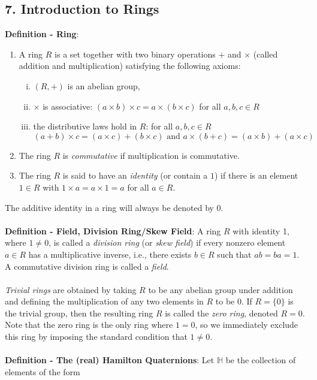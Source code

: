 \documentclass{article}
\begin{document}
\subsection*{7. Introduction to Rings}
\textbf{Definition - Ring}: \begin{enumerate}
    \item A ring $R$ is a set together with two binary operations $+$ and $\times$ (called addition and multiplication) satisfying the following axioms: \begin{enumerate}[(i).]
        \item $(R, +)$ is an abelian group,
        \item $\times$ is associative: $(a \times b) \times c = a \times (b \times c)$ for all $a, b, c \in R$
        \item the distributive laws hold in $R$: for all $a, b, c \in R$ $$(a + b) \times c = (a \times c) + (b \times c) \text{ and } a \times (b + c) = (a \times b) + (a \times c)$$
    \end{enumerate}
    \item The ring $R$ is \textit{commutative} if multiplication is commutative.
    \item The ring $R$ is said to have an \textit{identity} (or contain a $1$) if there is an element $1 \in R$ with $1 \times a = a \times 1 = a$ for all $a \in R$.
\end{enumerate} $ $ \\
The additive identity in a ring will always be denoted by 0. \\ \\
\textbf{Definition - Field, Division Ring/Skew Field}: A ring $R$ with identity 1, where $1 \neq 0$, is called a \textit{division ring} (or \textit{skew
field}) if every nonzero element $a \in R$ has a multiplicative inverse, i.e., there exists $b \in R$ such that $ab = ba = 1$. A commutative division ring is called a \textit{field}. \\ \\
\textit{Trivial rings} are obtained by taking $R$ to be any abelian group under addition and defining the multiplication of any two elements in $R$ to be 0. If $R = \{0\}$ is the trivial group, then the resulting ring $R$ is called the \textit{zero ring}, denoted $R = 0.$ Note that the zero ring is the only ring where $1 = 0$, so we immediately exclude this ring by imposing the standard condition that $1 \neq 0.$ \\ \\
\textbf{Definition - The (real) Hamilton Quaternions}: Let $\mathbb{H}$ be the collection of elements of the form
\end{document}
